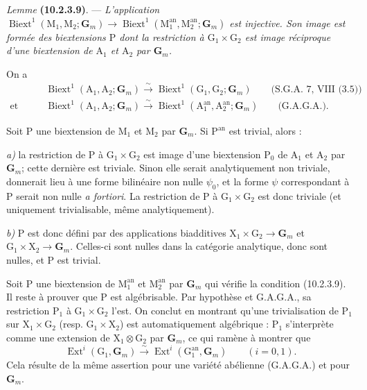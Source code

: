 \documentclass[11pt,leqno]{article}
\begin{document}
\textit{Lemme} \textbf{(10.2.3.9)}. — \textit{L’application
\(\operatorname{Biext}^{1}(\mathrm{M}_1,\mathrm{M}_2;\mathbf{G}_m)
\to\operatorname{Biext}^{1}(\mathrm{M}_1^{\mathrm{an}},
\mathrm{M}_2^{\mathrm{an}};\mathbf{G}_m)\)
est injective. Son image est formée des biextensions \(\mathrm{P}\)
dont la restriction à \(\mathrm{G}_1\times\mathrm{G}_2\) est image
réciproque d’une biextension de \(\mathrm{A}_1\) et
\(\mathrm{A}_2\) par \(\mathbf{G}_m\).}

On a
\begin{align*}
&\operatorname{Biext}^{1}(\mathrm{A}_1,\mathrm{A}_2;\mathbf{G}_m)
\xrightarrow{\sim}
\operatorname{Biext}^{1}(\mathrm{G}_1,\mathrm{G}_2;\mathbf{G}_m)
\qquad\text{(S.G.A. 7, VIII (3.5))}\\
\text{et}\qquad&
\operatorname{Biext}^{1}(\mathrm{A}_1,\mathrm{A}_2;\mathbf{G}_m)
\xrightarrow{\sim}
\operatorname{Biext}^{1}(\mathrm{A}_1^{\mathrm{an}},
\mathrm{A}_2^{\mathrm{an}};\mathbf{G}_m)
\qquad\text{(G.A.G.A.).}
\end{align*}

Soit \(\mathrm{P}\) une biextension de \(\mathrm{M}_1\) et
\(\mathrm{M}_2\) par \(\mathbf{G}_m\). Si
\(\mathrm{P}^{\mathrm{an}}\) est trivial, alors :

\textit{a)} la restriction de \(\mathrm{P}\) à
\(\mathrm{G}_1\times\mathrm{G}_2\) est image d’une biextension
\(\mathrm{P}_0\) de \(\mathrm{A}_1\) et \(\mathrm{A}_2\) par
\(\mathbf{G}_m\); cette dernière est triviale. Sinon elle serait
analytiquement non triviale, donnerait lieu à une forme bilinéaire
non nulle \(\psi_0\), et la forme \(\psi\) correspondant à
\(\mathrm{P}\) serait non nulle \textit{a fortiori}. La restriction
de \(\mathrm{P}\) à \(\mathrm{G}_1\times\mathrm{G}_2\) est donc
triviale (et uniquement trivialisable, même analytiquement).

\textit{b)} \(\mathrm{P}\) est donc défini par des applications
biadditives \(\mathrm{X}_1\times\mathrm{G}_2\to\mathbf{G}_m\) et
\(\mathrm{G}_1\times\mathrm{X}_2\to\mathbf{G}_m\). Celles-ci sont
nulles dans la catégorie analytique, donc sont nulles, et
\(\mathrm{P}\) est trivial.

Soit \(\mathrm{P}\) une biextension de
\(\mathrm{M}_1^{\mathrm{an}}\) et \(\mathrm{M}_2^{\mathrm{an}}\)
par \(\mathbf{G}_m\) qui vérifie la condition (10.2.3.9).
Il reste à prouver que \(\mathrm{P}\) est algébrisable. Par
hypothèse et G.A.G.A., sa restriction \(\mathrm{P}_1\) à
\(\mathrm{G}_1\times\mathrm{G}_2\) l’est. On conclut en montrant
qu’une trivialisation de \(\mathrm{P}_1\) sur
\(\mathrm{X}_1\times\mathrm{G}_2\)
(resp. \(\mathrm{G}_1\times\mathrm{X}_2\)) est automatiquement
algébrique : \(\mathrm{P}_1\) s’interprète comme une extension de
\(\mathrm{X}_1\otimes\mathrm{G}_2\) par \(\mathbf{G}_m\), ce qui
ramène à montrer que
\[
\operatorname{Ext}^{i}(\mathrm{G}_1,\mathbf{G}_m)
\xrightarrow{\sim}
\operatorname{Ext}^{i}(\mathrm{G}_1^{\mathrm{an}},\mathbf{G}_m)
\qquad(i=0,1).
\]
Cela résulte de la même assertion pour une variété abélienne
(G.A.G.A.) et pour \(\mathbf{G}_m\).
\end{document}
